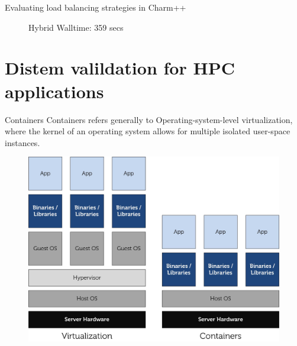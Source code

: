 \documentclass[11pt,xcolor=dvipsnames,presentation]{beamer}
\begin{document}
\begin{frame}[label=sec-3-0-12]{Evaluating load balancing strategies in Charm++}
\begin{minipage}{0.3\textwidth}
\begin{center}
\begin{figure}
    \caption{\centering Hybrid \newline Walltime: 359 secs}
        \label{fig:hybridlbh}
\end{figure}
    \end{center}\end{minipage}
\end{frame}

\section{Distem valildation for HPC applications}
\label{sec-4}
\begin{frame}[label=sec-4-0-1]{Containers}
\alert{Containers} refers generally to \alert{Operating-system-level virtualization},
 where the \alert{kernel} of an operating system allows for multiple isolated \alert{user-space instances}.

\begin{figure}[!h]
  \center
  \includegraphics[scale=0.65]{figures/lxc-vm.jpg}
  \label{fig:hpc}
\end{figure}
\end{frame}
\end{document}
